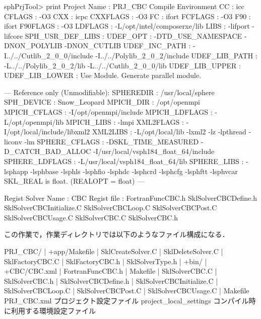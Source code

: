 {\small
\begin{program}
sphPrjTool> print         
Project Name : PRJ_CBC
  Compile Environment
    CC                  : icc
    CFLAGS              : -O3
    CXX                 : icpc
    CXXFLAGS            : -O3
    FC                  : ifort
    FCFLAGS             : -O3
    F90                 : ifort
    F90FLAGS            : -O3
    LDFLAGS             : -L/opt/intel/composerxe/lib
    LIBS                : -lifport -lifcore
    SPH_USR_DEF_LIBS    : 
    UDEF_OPT            : -DTD_USE_NAMESPACE -DNON_POLYLIB -DNON_CUTLIB
    UDEF_INC_PATH       : -I../../Cutlib_2_0_0/include -I../../Polylib_2_0_2/include
    UDEF_LIB_PATH       : -L../../Polylib_2_0_2/lib -L../../Cutlib_2_0_0/lib
    UDEF_LIB_UPPER      : 
    UDEF_LIB_LOWER      : 
    Use Module.
        Generate parallel module.

    ---
    Reference only (Unmodifiable):
    SPHEREDIR           : /usr/local/sphere
    SPH_DEVICE          : Snow_Leopard
    MPICH_DIR           : /opt/openmpi
    MPICH_CFLAGS        : -I/opt/openmpi/include
    MPICH_LDFLAGS       : -L/opt/openmpi/lib
    MPICH_LIBS          : -lmpi
    XML2FLAGS           : -I/opt/local/include/libxml2
    XML2LIBS            : -L/opt/local/lib -lxml2 -lz -lpthread -liconv -lm
    SPHERE_CFLAGS       : -DSKL_TIME_MEASURED -D_CATCH_BAD_ALLOC -I/usr/local/vsph184_float_64/include
    SPHERE_LDFLAGS      : -L/usr/local/vsph184_float_64/lib
    SPHERE_LIBS         : -lsphapp -lsphbase -lsphls -lsphfio -lsphdc -lsphcrd -lsphcfg 
                          -lsphftt -lsphvcar
    SKL_REAL is float. (REALOPT = float)
    ---

  Regist Solver
    Name : CBC
      Regist file :
        FortranFuncCBC.h
        SklSolverCBCDefine.h
        SklSolverCBCInitialize.C
        SklSolverCBCLoop.C
        SklSolverCBCPost.C
        SklSolverCBCUsage.C
        SklSolverCBC.C
        SklSolverCBC.h
\end{program}
}

\noindent この作業で，作業ディレクトリでは以下のようなファイル構成になる．

{\small
\begin{program}
PRJ_CBC/
   |
   +app/Makefile
   |    SklCreateSolver.C
   |    SklDeleteSolver.C
   |    SklFactoryCBC.C
   |    SklFactoryCBC.h
   |    SklSolverType.h
   |
   +bin/
   |
   +CBC/CBC.xml
   |    FortranFuncCBC.h
   |    Makefile
   |    SklSolverCBC.C
   |    SklSolverCBC.h
   |    SklSolverCBCDefine.h
   |    SklSolverCBCInitialize.C
   |    SklSolverCBCLoop.C
   |    SklSolverCBCPost.C
   |    SklSolverCBCUsage.C
   |
   Makefile
   PRJ_CBC.xml               プロジェクト設定ファイル
   project_local_settings    コンパイル時に利用する環境設定ファイル
   
\end{program}
}

